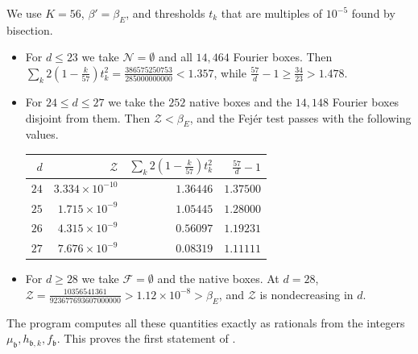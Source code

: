 \documentclass[11pt,colorlinks]{charlie}
\begin{document}
We use $K=56$, $\beta'=\beta_E$, and thresholds $t_k$ that are multiples of $10^{-5}$ found by bisection.
\begin{itemize}
\item For $d\le23$ we take $\mathcal N=\emptyset$ and all $14{,}464$ Fourier boxes. Then $\sum_k2(1-\frac k{57})t_k^2=\frac{386575250753}{285000000000}<1.357$, while $\frac{57}d-1\ge\frac{34}{23}>1.478$.
\item For $24\le d\le27$ we take the $252$ native boxes and the $14{,}148$ Fourier boxes disjoint from them. Then $\mathcal Z<\beta_E$, and the Fej\'er test passes with the following values.
\begin{center}\small
\begin{tabular}{@{}rrrr@{}}
\toprule
$d$ & $\mathcal Z$ & $\sum_k2(1-\frac k{57})t_k^2$ & $\frac{57}d-1$\\
\midrule
$24$ & $3.334\times10^{-10}$ & $1.36446$ & $1.37500$\\
$25$ & $1.715\times10^{-9}$ & $1.05445$ & $1.28000$\\
$26$ & $4.315\times10^{-9}$ & $0.56097$ & $1.19231$\\
$27$ & $7.676\times10^{-9}$ & $0.08319$ & $1.11111$\\
\bottomrule
\end{tabular}
\end{center}
\item For $d\ge28$ we take $\mathcal F=\emptyset$ and the native boxes. At $d=28$, $\mathcal Z=\frac{10356541361}{923677693607000000}>1.12\times10^{-8}>\beta_E$, and $\mathcal Z$ is nondecreasing in $d$.
\end{itemize}
The program computes all these quantities exactly as rationals from the integers $\mu_{\mathfrak b},h_{\mathfrak b,k},f_{\mathfrak b}$. This proves the first statement of .
\end{document}
